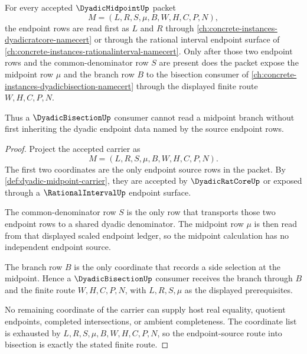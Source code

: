 \begin{theorem}
\label{thm:dyadic-midpoint-endpoint-source-route}
For every accepted $\DyadicMidpointUp$ packet
$$
M=(L,R,S,\mu,B,W,H,C,P,N),
$$
the endpoint rows are read first as $L$ and $R$ through \autoref{ch:concrete-instances-dyadicratcore-namecert} or through the rational interval endpoint surface of \autoref{ch:concrete-instances-rationalinterval-namecert}. Only after those two endpoint rows and the common-denominator row $S$ are present does the packet expose the midpoint row $\mu$ and the branch row $B$ to the bisection consumer of \autoref{ch:concrete-instances-dyadicbisection-namecert} through the displayed finite route $W,H,C,P,N$.

Thus a $\DyadicBisectionUp$ consumer cannot read a midpoint branch without first inheriting the dyadic endpoint data named by the source endpoint rows.
\end{theorem}
\begin{proof}
Project the accepted carrier as
$$
M=(L,R,S,\mu,B,W,H,C,P,N).
$$
The first two coordinates are the only endpoint source rows in the packet. By \autoref{def:dyadic-midpoint-carrier}, they are accepted by $\DyadicRatCoreUp$ or exposed through a $\RationalIntervalUp$ endpoint surface.

The common-denominator row $S$ is the only row that transports those two endpoint rows to a shared dyadic denominator. The midpoint row $\mu$ is then read from that displayed scaled endpoint ledger, so the midpoint calculation has no independent endpoint source.

The branch row $B$ is the only coordinate that records a side selection at the midpoint. Hence a $\DyadicBisectionUp$ consumer receives the branch through $B$ and the finite route $W,H,C,P,N$, with $L,R,S,\mu$ as the displayed prerequisites.

No remaining coordinate of the carrier can supply host real equality, quotient endpoints, completed intersections, or ambient completeness. The coordinate list is exhausted by $L,R,S,\mu,B,W,H,C,P,N$, so the endpoint-source route into bisection is exactly the stated finite route.
\end{proof}

